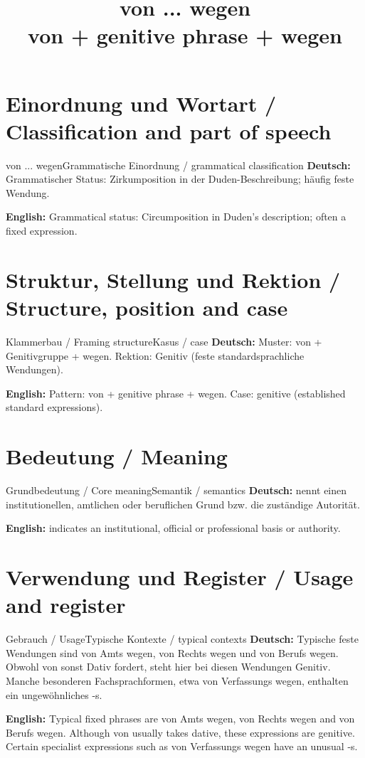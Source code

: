 \documentclass[a4paper,11pt]{article}
\title{von ... wegen\\ \large von + genitive phrase + wegen}
\date{}
\newcommand{\GermanText}[1]{\textbf{Deutsch: }#1\par}
\newcommand{\EnglishText}[1]{{\small\color{SoftGray}\textbf{English: }#1\par}}
\begin{document}
\maketitle
\tableofcontents
\newpage
\section{Einordnung und Wortart / Classification and part of speech}
\begin{grammarentry}{von ... wegen}{Grammatische Einordnung / grammatical classification}
\GermanText{Grammatischer Status: Zirkumposition in der Duden-Beschreibung; häufig feste Wendung.}
\EnglishText{Grammatical status: Circumposition in Duden's description; often a fixed expression.}
\end{grammarentry}
\section{Struktur, Stellung und Rektion / Structure, position and case}
\begin{grammarentry}{Klammerbau / Framing structure}{Kasus / case}
\GermanText{Muster: von + Genitivgruppe + wegen. Rektion: Genitiv (feste standardsprachliche Wendungen).}
\EnglishText{Pattern: von + genitive phrase + wegen. Case: genitive (established standard expressions).}
\end{grammarentry}
\section{Bedeutung / Meaning}
\begin{grammarentry}{Grundbedeutung / Core meaning}{Semantik / semantics}
\GermanText{nennt einen institutionellen, amtlichen oder beruflichen Grund bzw. die zuständige Autorität.}
\EnglishText{indicates an institutional, official or professional basis or authority.}
\end{grammarentry}
\section{Verwendung und Register / Usage and register}
\begin{grammarentry}{Gebrauch / Usage}{Typische Kontexte / typical contexts}
\GermanText{Typische feste Wendungen sind von Amts wegen, von Rechts wegen und von Berufs wegen. Obwohl von sonst Dativ fordert, steht hier bei diesen Wendungen Genitiv. Manche besonderen Fachsprachformen, etwa von Verfassungs wegen, enthalten ein ungewöhnliches -s.}
\EnglishText{Typical fixed phrases are von Amts wegen, von Rechts wegen and von Berufs wegen. Although von usually takes dative, these expressions are genitive. Certain specialist expressions such as von Verfassungs wegen have an unusual -s.}
\end{grammarentry}
\end{document}
